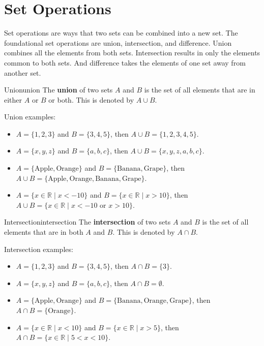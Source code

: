 \section{Set Operations}

Set operations are ways that two sets can be combined into a new set. The
foundational set operations are union, intersection, and difference. Union
combines all the elements from both sets. Intersection results in only the
elements common to both sets. And difference takes the elements of one
set away from another set.

\begin{definition}{Union}{union}
  The \textbf{union} of two sets \( A \) and \( B \) is the set of all elements
  that are in either \( A \) or \( B \) or both. This is denoted by \( A \cup B \).
\end{definition}

Union examples:
\begin{itemize}
  \item \( A = \{ 1, 2, 3 \} \) and \( B = \{ 3, 4, 5 \} \), then \( A \cup B = \{ 1, 2, 3, 4, 5 \} \).
  \item \( A = \{ x, y, z \} \) and \( B = \{ a, b, c \} \), then \( A \cup B = \{ x, y, z, a, b, c \} \).
  \item \( A = \{ \text{Apple}, \text{Orange} \} \) and \( B = \{ \text{Banana}, \text{Grape} \} \), then
  \( A \cup B = \{ \text{Apple}, \text{Orange}, \text{Banana}, \text{Grape} \} \).
  \item \( A = \{ x \in \mathbb{R} \mid x < -10 \} \) and \( B = \{ x \in \mathbb{R} \mid x > 10 \} \), then
  \( A \cup B = \{ x \in \mathbb{R} \mid x < -10 \text{ or } x > 10 \} \).
\end{itemize}

\begin{definition}{Intersection}{intersection}
  The \textbf{intersection} of two sets \( A \) and \( B \) is the set of all
  elements that are in both \( A \) and \( B \). This is denoted by \( A \cap B \).
\end{definition}

Intersection examples:
\begin{itemize}
  \item \( A = \{ 1, 2, 3 \} \) and \( B = \{ 3, 4, 5 \} \), then \( A \cap B = \{ 3 \} \).
  \item \( A = \{ x, y, z \} \) and \( B = \{ a, b, c \} \), then \( A \cap B = \emptyset \).
  \item \( A = \{ \text{Apple}, \text{Orange} \} \) and \( B = \{ \text{Banana}, \text{Orange}, \text{Grape} \} \), then
  \( A \cap B = \{ \text{Orange} \} \).
  \item \( A = \{ x \in \mathbb{R} \mid x < 10 \} \) and \( B = \{ x \in \mathbb{R} \mid x > 5 \} \), then
  \( A \cap B = \{ x \in \mathbb{R} \mid 5 < x < 10 \} \).
\end{itemize}

